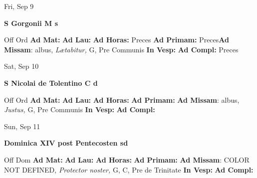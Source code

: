 \documentclass[10pt]{memoir}
\begin{document}
\begin{center}
\begin{minipage}{3.5in}
\vspace{2em}
\begin{center}Fri, Sep 9
\end{center}
\textbf{ \large S Gorgonii M
\textnormal{\normalsize s}}

\begin{justify}Off Ord
\textbf{Ad Mat: }
\textbf{Ad Lau: }
\textbf{Ad Horas: }Preces
\textbf{Ad Primam: }Preces\textbf{Ad Missam}: albus, \textit{Lætabitur,} G, Pre Communis
\textbf{In Vesp: }
\textbf{Ad Compl: }Preces
\end{justify}
\end{minipage}
\end{center}

\begin{center}
\begin{minipage}{3.5in}
\vspace{2em}
\begin{center}Sat, Sep 10
\end{center}
\textbf{ \large S Nicolai de Tolentino C
\textnormal{\normalsize d}}

\begin{justify}Off Ord
\textbf{Ad Mat: }
\textbf{Ad Lau: }
\textbf{Ad Horas: }
\textbf{Ad Primam: }\textbf{Ad Missam}: albus, \textit{Justus,} G, Pre Communis
\textbf{In Vesp: }
\textbf{Ad Compl: }
\end{justify}
\end{minipage}
\end{center}

\begin{center}
\begin{minipage}{3.5in}
\vspace{2em}
\begin{center}Sun, Sep 11
\end{center}
\textbf{ \large Dominica XIV post Pentecosten
\textnormal{\normalsize sd}}

\begin{justify}Off Dom
\textbf{Ad Mat: }
\textbf{Ad Lau: }
\textbf{Ad Horas: }
\textbf{Ad Primam: }\textbf{Ad Missam}: COLOR NOT DEFINED, \textit{Protector noster,} G, C, Pre de Trinitate
\textbf{In Vesp: }
\textbf{Ad Compl: }
\end{justify}
\end{minipage}
\end{center}
\end{document}
